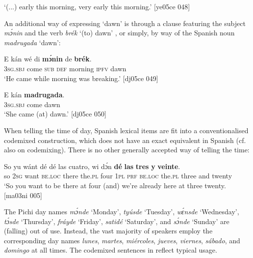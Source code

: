 \glt ‘(...) early this morning, very early this morning.’ [ye05ce 048]
\z

An additional way of expressing ‘dawn’ is through a clause featuring the subject \textit{mɔ́nin} and the verb \textit{brék} ‘(to) dawn’ , or simply, by way of the Spanish noun \textit{madrugada} ‘dawn’:


\ea%
    \label{ex:key:999}
    \gll E    kán    wé  di  \textbf{mɔ́nin}  de  \textbf{brék}.\\
\textsc{3sg.sbj}  come  \textsc{sub}  \textsc{def}  morning  \textsc{ipfv}  dawn\\

\glt ‘He came while morning was breaking.’ [dj05ce 049]
\z


\ea%
    \label{ex:key:1000}
    \gll E    kán    \textbf{madrugada}.\\
\textsc{3sg.sbj}  come  dawn\\

\glt ‘She came (at) dawn.’ [dj05ce 050]
\z

When telling the time of day, Spanish lexical items are fit into a conventionalised codemixed construction, which does not have an exact equivalent in Spanish (cf. also  on codemixing). There is no other generally accepted way of telling the time:


\ea%
    \label{ex:key:1001}
    \gll So  yu  wánt  dé    dé    las    cuatro,  wi  dɔ́n  \textbf{dé} 
\textbf{las}    \textbf{tres}    \textbf{y}  \textbf{veinte}.\\
so  \textsc{2sg}  want  \textsc{be.loc}  there  the.\textsc{pl}  four    \textsc{1pl}  \textsc{prf}  \textsc{be.loc}
the.\textsc{pl}  three  and  twenty\\

\glt ‘So you want to be there at four (and) we’re already here
at three twenty. [ma03ni 005]
\z

The Pichi day names \textit{mɔ́nde} ‘Monday’, \textit{tyúsde} ‘Tuesday’, \textit{wɛ́nsde} ‘Wednesday’, \textit{tɔ́sde} ‘Thursday’, \textit{fráyde} ‘Friday’, \textit{satidé} ‘Saturday’, and \textit{sɔ́nde} ‘Sunday’ are (falling) out of use. Instead, the vast majority of speakers employ the corresponding  day names \textit{lunes}, \textit{martes}, \textit{miércoles}, \textit{jueves}, \textit{viernes}, \textit{sábado}, and \textit{domingo} at all times. The codemixed sentences in  reflect typical usage. 


\ea%
    \label{ex:key:1002}
\z\z

